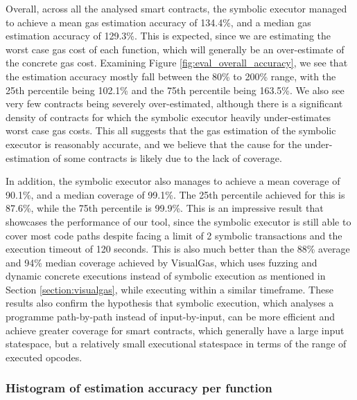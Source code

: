 Overall, across all the analysed smart contracts, the symbolic executor managed to achieve a 
mean gas estimation accuracy of 134.4\%, and a median gas estimation accuracy of 129.3\%.
This is expected, since we are estimating the worst case gas cost of each function, which will
generally be an over-estimate of the concrete gas cost. Examining Figure \ref{fig:eval_overall_accuracy},
we see that the estimation accuracy mostly fall between the 80\% to 200\% range, with the 25th percentile being
102.1\% and the 75th percentile being 163.5\%. We also see very few contracts being severely over-estimated,
although there is a significant density of contracts for which the symbolic executor heavily under-estimates
worst case gas costs. This all suggests that the gas estimation of the symbolic executor is reasonably accurate,
and we believe that the cause for the under-estimation of some contracts is likely due to the lack of coverage.

In addition, the symbolic executor also manages to achieve a mean coverage of 90.1\%, and a median 
coverage of 99.1\%. The 25th percentile achieved for this is 87.6\%, while the 75th percentile is 99.9\%.
This is an impressive result that showcases the performance of our tool, 
since the symbolic executor is still able to cover most code paths
despite facing a limit of 2 symbolic transactions and the execution timeout of 120 seconds.
This is also much better
than the 88\% average and 94\% median coverage achieved by VisualGas, which uses fuzzing and dynamic concrete 
executions instead of symbolic execution as mentioned in Section \ref{section:visualgas}, 
while executing within a similar timeframe. These results also confirm the hypothesis that symbolic execution, which 
analyses a programme path-by-path instead of input-by-input, can be more efficient and achieve greater
coverage for smart contracts, which generally have a large input statespace, but a relatively small executional 
statespace in terms of the range of executed opcodes. 

\subsubsection{Histogram of estimation accuracy per function}


